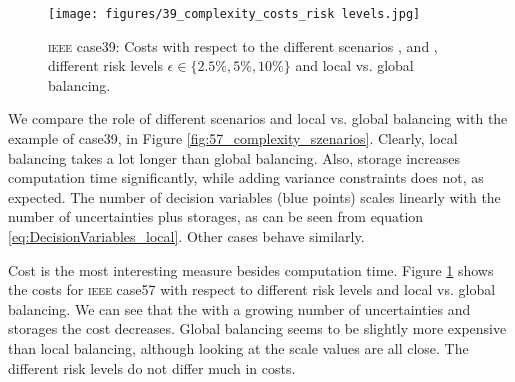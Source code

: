 \documentclass[final,3p,times,twocolumn]{elsarticle}  %
\newcommand{\todo}[1]{\textcolor{orange}{[#1]}}
\begin{document}
\begin{figure}
    \texttt{[image: figures/39\_complexity\_costs\_risk levels.jpg]}
    \caption{\textsc{ieee} case39: Costs with respect to the different scenarios \caseNoStorage, \caseStorage and \caseStorageWithVariance, different risk levels $\epsilon\in\{2.5\%, 5\%, 10\%\}$ and local vs. global balancing.}
    \label{fig:39_complexity_risk_level}
\end{figure}

We compare the role of different scenarios and local vs. global balancing with the example of case39, in Figure \ref{fig:57_complexity_szenarios}. Clearly, local balancing takes a lot longer than global balancing. Also, storage increases computation time significantly, while adding variance constraints does not, as expected. The number of decision variables (blue points) scales linearly with the number of uncertainties plus storages, as can be seen from equation \eqref{eq:DecisionVariables_local}.
Other cases behave similarly.

Cost is the most interesting measure besides computation time. 
Figure \ref{fig:39_complexity_risk_level} shows the costs for \textsc{ieee} case57 with respect to different risk levels and local vs. global balancing. We can see that the with a growing number of uncertainties and storages the cost decreases. Global balancing seems to be slightly more expensive than local balancing, although looking at the scale values are all close. The different risk levels do not differ much in costs.




\end{document}
